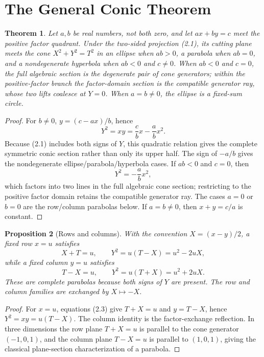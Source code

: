 \documentclass[11pt]{amsart}
\newtheorem{theorem}{Theorem}[section]
\newtheorem{proposition}[theorem]{Proposition}
\theoremstyle{remark}
\numberwithin{equation}{section}
\begin{document}
\section{The General Conic Theorem}
\begin{theorem}\label{thm:conic}
Let $a,b$ be real numbers, not both zero, and let $ax+by=c$ meet the positive factor quadrant. Under the two-sided projection (2.1), its cutting plane meets the cone $X^2+Y^2=T^2$ in an ellipse when $ab>0$, a parabola when $ab=0$, and a nondegenerate hyperbola when $ab<0$ and $c\ne0$. When $ab<0$ and $c=0$, the full algebraic section is the degenerate pair of cone generators; within the positive-factor branch the factor-domain section is the compatible generator ray, whose two lifts coalesce at $Y=0$. When $a=b\ne0$, the ellipse is a fixed-sum circle.
\end{theorem}
\begin{proof}
For $b\ne0$, $y=(c-ax)/b$, hence
\begin{equation}
Y^2=xy=\frac cbx-\frac abx^2.
\end{equation}
Because (2.1) includes both signs of $Y$, this quadratic relation gives the complete symmetric conic section rather than only its upper half. The sign of $-a/b$ gives the nondegenerate ellipse/parabola/hyperbola cases. If $ab<0$ and $c=0$, then
\begin{equation}
Y^2=-\frac ab x^2,
\end{equation}
which factors into two lines in the full algebraic cone section; restricting to the positive factor domain retains the compatible generator ray. The cases $a=0$ or $b=0$ are the row/column parabolas below. If $a=b\ne0$, then $x+y=c/a$ is constant.
\end{proof}

\begin{proposition}[Rows and columns]\label{prop:rows}
With the convention $X=(x-y)/2$, a fixed row $x=u$ satisfies
\begin{equation}
X+T=u,\qquad Y^2=u(T-X)=u^2-2uX,
\end{equation}
while a fixed column $y=u$ satisfies
\begin{equation}
T-X=u,\qquad Y^2=u(T+X)=u^2+2uX.
\end{equation}
These are complete parabolas because both signs of $Y$ are present. The row and column families are exchanged by $X\mapsto-X$.
\end{proposition}

\begin{proof}
For $x=u$, equations (2.3) give $T+X=u$ and $y=T-X$, hence $Y^2=xy=u(T-X)$. The column identity is the factor-exchange reflection. In three dimensions the row plane $T+X=u$ is parallel to the cone generator $(-1,0,1)$, and the column plane $T-X=u$ is parallel to $(1,0,1)$, giving the classical plane-section characterization of a parabola.
\end{proof}
\end{document}
